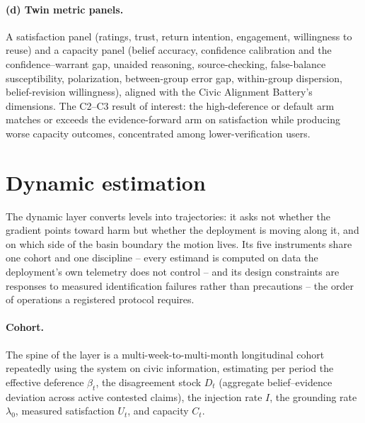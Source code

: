 \documentclass[11pt]{article}
\theoremstyle{definition}
\theoremstyle{remark}
\numberwithin{equation}{section}
\begin{document}
\paragraph{(d) Twin metric panels.} A satisfaction panel (ratings, trust, return intention, engagement, willingness to reuse) and a capacity panel (belief accuracy, confidence calibration and the confidence--warrant gap, unaided reasoning, source-checking, false-balance susceptibility, polarization, between-group error gap, within-group dispersion, belief-revision willingness), aligned with the Civic Alignment Battery's dimensions. The C2--C3 result of interest: the high-deference or default arm matches or exceeds the evidence-forward arm on satisfaction while producing worse capacity outcomes, concentrated among lower-verification users.

\section{Dynamic estimation}\label{sec:dynamics}

The dynamic layer converts levels into trajectories: it asks not whether the gradient points toward harm but whether the deployment is moving along it, and on which side of the basin boundary the motion lives. Its five instruments share one cohort and one discipline -- every estimand is computed on data the deployment's own telemetry does not control -- and its design constraints are responses to measured identification failures rather than precautions -- the order of operations a registered protocol requires.

\paragraph{Cohort.} The spine of the layer is a multi-week-to-multi-month longitudinal cohort repeatedly using the system on civic information, estimating per period the effective deference $\beta_t$, the disagreement stock $D_t$ (aggregate belief--evidence deviation across active contested claims), the injection rate $I$, the grounding rate $\lambda_0$, measured satisfaction $U_t$, and capacity $C_t$.
\end{document}
